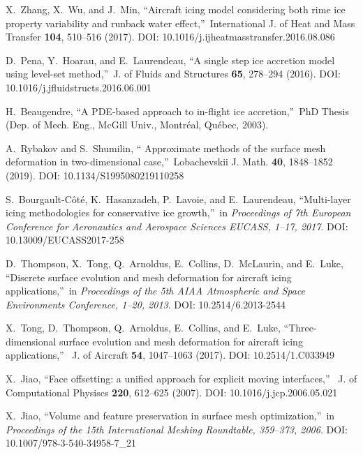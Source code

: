\documentclass[
11pt,
tightenlines,
twoside,
onecolumn,
nofloats,
nobibnotes,
nofootinbib,
superscriptaddress,
noshowpacs,
centertags]
{revtex4}
\begin{document}
\begin{thebibliography}{99}
X.~Zhang, X.~Wu, and J.~Min, \textquotedblleft Aircraft icing  model
considering both rime ice property variability and runback water
effect,\textquotedblright \ International J. of Heat and Mass
Transfer {\bf 104}, 510--516 (2017). DOI: 10.1016/j.ijheatmasstransfer.2016.08.086

D.~Pena, Y.~Hoarau, and E.~Laurendeau, \textquotedblleft A  single
step ice accretion model using level-set method,\textquotedblright \
J. of Fluids and Structures {\bf 65}, 278--294 (2016). DOI: 10.1016/j.jfluidstructs.2016.06.001

 H.~Beaugendre, \textquotedblleft A PDE-based approach
to in-flight ice accretion,\textquotedblright \ PhD Thesis (Dep. of
Mech. Eng., McGill Univ., Montr\'eal, Qu\'ebec, 2003).

 A.~Rybakov and S.~Shumilin, \textquotedblleft
Approximate  methods of the surface mesh deformation in
two-dimensional case,\textquotedblright \ Lobachevskii J. Math. {\bf
40}, 1848--1852 (2019). DOI: 10.1134/S1995080219110258

 S.~Bourgault-C\^ot\'e, K.~Hasanzadeh, P.~Lavoie,
and E.~Laurendeau, \textquotedblleft Multi-layer  icing
methodologies for conservative ice growth,\textquotedblright \ in
\textit{Proceedings of 7th European Conference for Aeronautics and
Aerospace Sciences EUCASS, 1--17, 2017}. DOI: 10.13009/EUCASS2017-258

 D.~Thompson, X.~Tong, Q.~Arnoldus, E.~Collins,
D.~McLaurin, and E.~Luke, \textquotedblleft Discrete  surface
evolution and mesh deformation for aircraft icing
applications,\textquotedblright \ in \textit{Proceedings of the 5th
AIAA Atmospheric and Space Environments Conference, 1--20, 2013}. DOI: 10.2514/6.2013-2544

 X.~Tong, D.~Thompson, Q.~Arnoldus, E.~Collins, and
E.~Luke, \textquotedblleft Three-dimensional  surface evolution and
mesh deformation for aircraft icing applications,\textquotedblright
\ J. of Aircraft {\bf 54}, 1047--1063 (2017). DOI: 10.2514/1.C033949

 X.~Jiao, \textquotedblleft Face offsetting: a
unified approach  for explicit moving interfaces,\textquotedblright
\ J. of Computational Physiscs {\bf 220}, 612--625 (2007). DOI: 10.1016/j.jcp.2006.05.021

 X.~Jiao, \textquotedblleft Volume and feature
preservation in  surface mesh optimization,\textquotedblright \ in
\textit{Proceedings of the 15th International Meshing Roundtable, 359--373, 2006}. DOI: 10.1007/978-3-540-34958-7\_21


\end{thebibliography}
\end{document}
